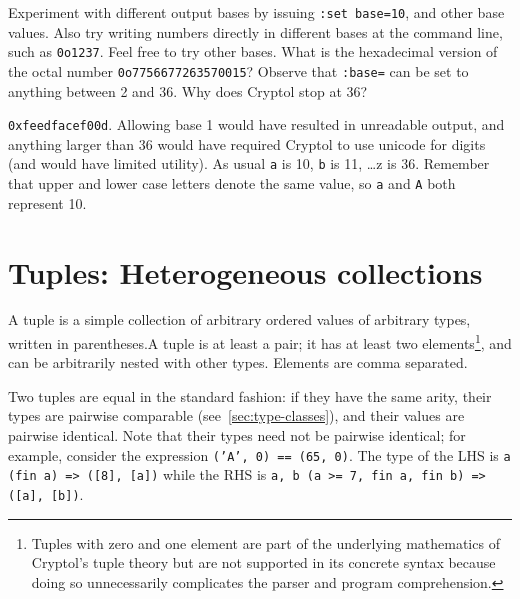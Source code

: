 \begin{Exercise}\label{ex:setBase}
  Experiment with different output bases by issuing {\tt :set
    base=10}, and other base values. Also try writing numbers directly
  in different bases at the command line, such as {\tt 0o1237}.  Feel
  free to try other bases.  What is the hexadecimal version of the
  octal number {\tt 0o7756677263570015}?  Observe that {\tt :base=}
  can be set to anything between 2 and 36. Why does Cryptol stop at
  36?
\end{Exercise}
\begin{Answer}
{\tt 0xfeedfacef00d}.
Allowing base 1 would have resulted in unreadable output, and anything
larger than 36 would have required Cryptol to use unicode for digits
(and would have limited utility). As usual {\tt a} is 10, {\tt b} is
11, \ldots z is 36. Remember that upper and lower case letters denote
the same value, so {\tt a} and {\tt A} both represent 10.
\end{Answer}


\section{Tuples: Heterogeneous collections}
\label{sec:tuple}

A tuple is a simple collection of arbitrary ordered values of
arbitrary types, written in parentheses.\indTheTupleType A tuple is at
least a pair; it has at least two elements\footnote{Tuples with zero
  and one element are part of the underlying mathematics of Cryptol's
  tuple theory but are not supported in its concrete syntax because
  doing so unnecessarily complicates the parser and program
  comprehension.}, and can be arbitrarily nested with other types.
Elements are comma separated.  

Two tuples are equal in the standard fashion: if they have the same
arity, their types are pairwise comparable
(see~\autoref{sec:type-classes}), and their values are pairwise
identical.  Note that their types need not be pairwise identical; for
example, consider the expression \texttt{('A', 0) == (65, 0)}.  The
type of the LHS is \texttt{{a} (fin a) => ([8], [a])} while the RHS is
\texttt{{a, b} (a >= 7, fin a, fin b) => ([a], [b])}.

